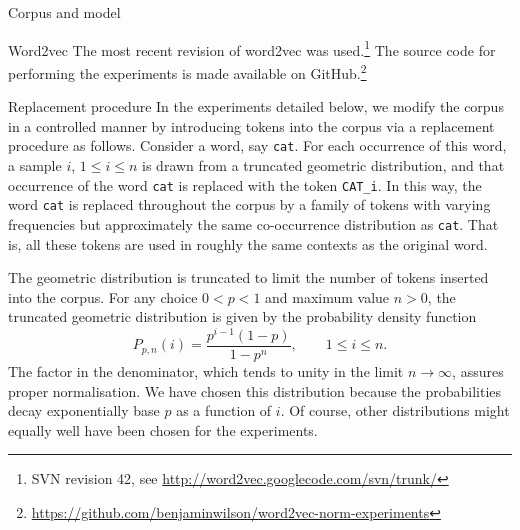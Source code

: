\documentclass{article} %
\newcommand{\word}[1]{\texttt{#1}}
\begin{document}
\begin{section}{Corpus and model}
\begin{subsection}{Word2vec}
The most recent revision of word2vec was used.\footnote{SVN revision 42,
  see \url{http://word2vec.googlecode.com/svn/trunk/}} The source code
for performing the experiments is made available on
GitHub.\footnote{\url{https://github.com/benjaminwilson/word2vec-norm-experiments}}

\begin{table}
	
	\caption{ Number of words, by frequency band, as observed in the
          unmodified corpus.  }
	\label{word-occurrences-table}
\end{table}
\end{subsection}

\begin{subsection}{Replacement procedure}\label{replacement-procedure}
In the experiments detailed below, we modify the corpus in a controlled
manner by introducing tokens into the corpus via a replacement procedure
as follows.  Consider a word, say \word{cat}.  For each occurrence of
this word, a sample $i$, $1 \leqslant i \leqslant n$ is drawn from a
truncated geometric distribution, and that occurrence of the word
\word{cat} is replaced with the token \word{CAT\_i}.  In this way, the
word \word{cat} is replaced throughout the corpus by a family of tokens
with varying frequencies but approximately the same co-occurrence
distribution as \word{cat}.  That is, all these tokens are used in
roughly the same contexts as the original word.

The geometric distribution is truncated to limit the number of tokens
inserted into the corpus.  For any choice $0 < p < 1$ and maximum value
$n > 0$, the truncated geometric distribution is given by the
probability density function
\begin{equation} 
\label{distro}
P_{p, n} (i) = \frac{p^{i-1}  (1-p)}{1 - p^n}, \qquad 1
\leqslant i \leqslant n.
\end{equation} 
The factor in the denominator, which tends to unity in the limit $n \to
\infty$, assures proper normalisation.  We have chosen this distribution
because the probabilities decay exponentially base $p$ as a function of
$i$.  Of course, other distributions might equally well have been chosen
for the experiments.
\end{subsection}
\end{section}
\end{document}
